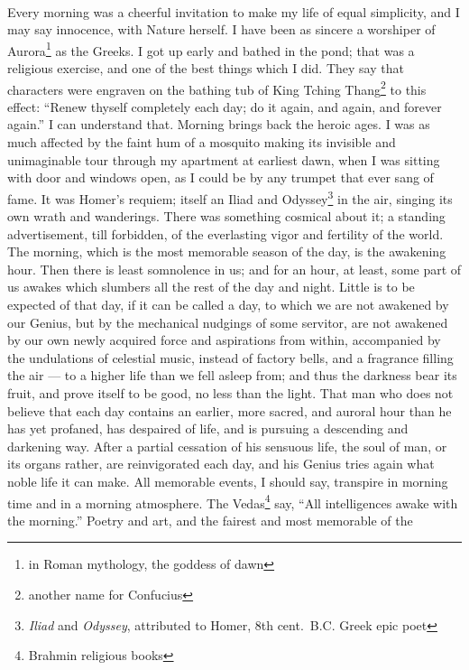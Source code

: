 \documentclass[letterpaper,12pt]{article}
\begin{document}
\paragraph{} Every morning was a cheerful invitation to make my life of equal
simplicity, and I may say innocence, with Nature herself. I have been as sincere
a worshiper of Aurora\footnote{in Roman mythology, the goddess of dawn} as the
Greeks. I got up early and bathed in the pond; that was a religious exercise,
and one of the best things which I did.  They say that characters were engraven
on the bathing tub of King Tching Thang\footnote{another name for Confucius} to
this effect: \enquote{Renew thyself completely each day; do it again, and again,
    and forever again.} I can understand that. Morning brings back the heroic
ages.  I was as much affected by the faint hum of a mosquito making its
invisible and unimaginable tour through my apartment at earliest dawn, when
I was sitting with door and windows open, as I could be by any trumpet that ever
sang of fame. It was Homer's requiem; itself an Iliad and
Odyssey\footnote{\textit{Iliad} and \textit{Odyssey}, attributed to Homer, 8th
    cent.\ B.C. Greek epic poet} in the air, singing its own wrath and
wanderings. There was something cosmical about it; a standing advertisement,
till forbidden, of the everlasting vigor and fertility of the world. The
morning, which is the most memorable season of the day, is the awakening hour.
Then there is least somnolence in us; and for an hour, at least, some part of us
awakes which slumbers all the rest of the day and night. Little is to be
expected of that day, if it can be called a day, to which we are not awakened by
our Genius, but by the mechanical nudgings of some servitor, are not awakened by
our own newly acquired force and aspirations from within, accompanied by the
undulations of celestial music, instead of factory bells, and a fragrance
filling the air --- to a higher life than we fell asleep from; and thus the
darkness bear its fruit, and prove itself to be good, no less than the light.
That man who does not believe that each day contains an earlier, more sacred,
and auroral hour than he has yet profaned, has despaired of life, and is
pursuing a descending and darkening way. After a partial cessation of his
sensuous life, the soul of man, or its organs rather, are reinvigorated each
day, and his Genius tries again what noble life it can make. All memorable
events, I should say, transpire in morning time and in a morning atmosphere. The
Vedas\footnote{Brahmin religious books} say, \enquote{All intelligences awake
    with the morning.} Poetry and art, and the fairest and most memorable of the
\end{document}
